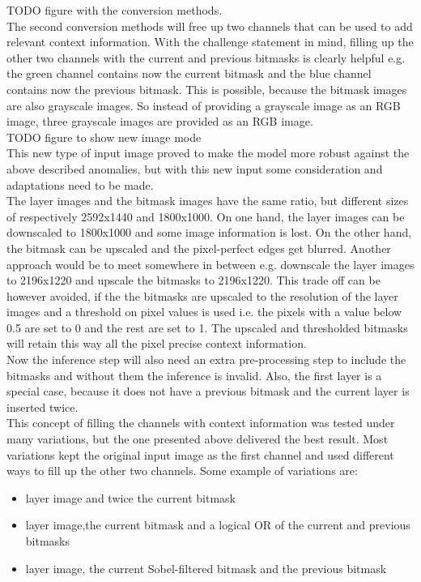 TODO figure with the conversion methods. \\

The second conversion methods will free up two channels that can be used to add relevant context information. With the challenge statement in mind, filling up the other two channels with the current and previous bitmasks is clearly helpful e.g. the green channel contains now the current bitmask and the blue channel contains now the previous bitmask. This is possible, because the bitmask images are also grayscale images. So instead of providing a grayscale image as an RGB image, three grayscale images are provided as an RGB image. \\

TODO figure to show new image mode \\

This new type of input image proved to make the model more robust against the above described anomalies, but with this new input some consideration and adaptations need to be made. \\
The layer images and the bitmask images have the same ratio, but different sizes of respectively 2592x1440 and 1800x1000. On one hand, the layer images can be downscaled to 1800x1000 and some image information is lost. On the other hand, the bitmask can be upscaled and the pixel-perfect edges get blurred. Another approach would be to meet somewhere in between e.g. downscale the layer images to 2196x1220 and upscale the bitmasks to 2196x1220. This trade off can be however avoided, if the the bitmasks are upscaled to the resolution of the layer images and a threshold on pixel values is used i.e. the pixels with a value below 0.5 are set to 0 and the rest are set to 1. The upscaled and thresholded bitmasks will retain this way all the pixel precise context information.  \\
Now the inference step will also need an extra pre-processing step to include the bitmasks and without them the inference is invalid. Also, the first layer is a special case, because it does not have a previous bitmask and the current layer is inserted twice. \\
This concept of filling the channels with context information was tested under many variations, but the one presented above delivered the best result. Most variations kept the original input image as the first channel and used different ways to fill up the other two channels. Some example of variations are:
\begin{itemize}
\item layer image and twice the current bitmask
\item layer image,the current bitmask and a logical OR of the current and previous bitmasks
\item layer image, the current Sobel-filtered bitmask and the previous bitmask
\end{itemize}
